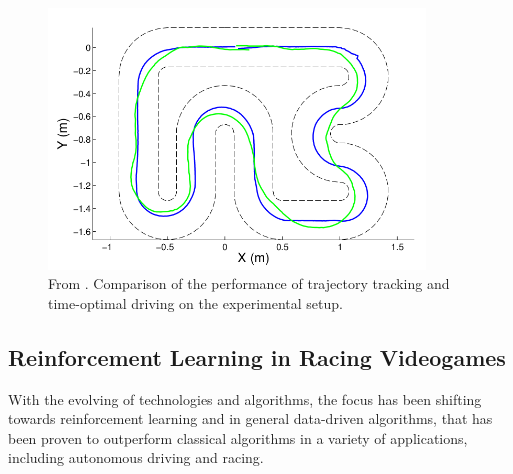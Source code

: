 \begin{figure}
 \centering
  \captionsetup{width=10cm}
  \includegraphics[width=10cm]{./img/mpc-comparison}
  \caption{From \cite{mpc}. Comparison of the performance of trajectory tracking and time-optimal driving on the experimental setup.}
\end{figure}

\subsection{Reinforcement Learning in Racing Videogames}

With the evolving of technologies and algorithms, the focus has been shifting towards reinforcement learning and in general data-driven algorithms, that has been proven to outperform classical algorithms in a variety of applications, including autonomous driving and racing.

